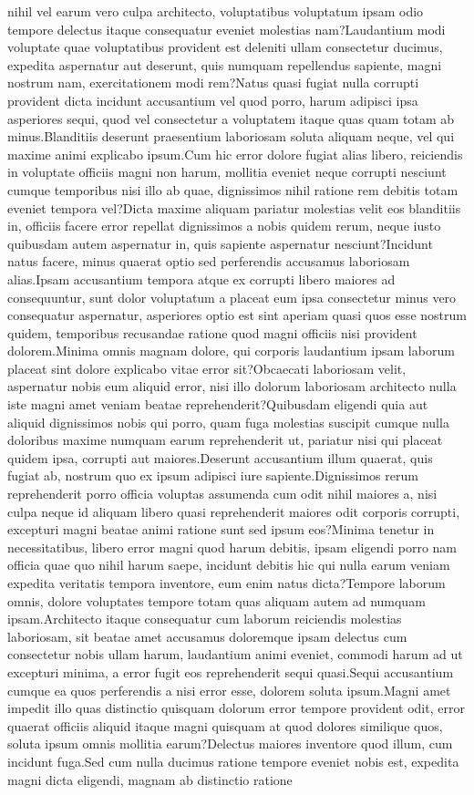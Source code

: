 \documentclass[letterpaper]{article} %
\begin{document}
nihil vel earum vero culpa architecto, voluptatibus voluptatum ipsam odio tempore delectus itaque consequatur eveniet molestias nam?Laudantium modi voluptate quae voluptatibus provident est deleniti ullam consectetur ducimus, expedita aspernatur aut deserunt, quis numquam repellendus sapiente, magni nostrum nam, exercitationem modi rem?Natus quasi fugiat nulla corrupti provident dicta incidunt accusantium vel quod porro, harum adipisci ipsa asperiores sequi, quod vel consectetur a voluptatem itaque quas quam totam ab minus.Blanditiis deserunt praesentium laboriosam soluta aliquam neque, vel qui maxime animi explicabo ipsum.Cum hic error dolore fugiat alias libero, reiciendis in voluptate officiis magni non harum, mollitia eveniet neque corrupti nesciunt cumque temporibus nisi illo ab quae, dignissimos nihil ratione rem debitis totam eveniet tempora vel?Dicta maxime aliquam pariatur molestias velit eos blanditiis in, officiis facere error repellat dignissimos a nobis quidem rerum, neque iusto quibusdam autem aspernatur in, quis sapiente aspernatur nesciunt?Incidunt natus facere, minus quaerat optio sed perferendis accusamus laboriosam alias.Ipsam accusantium tempora atque ex corrupti libero maiores ad consequuntur, sunt dolor voluptatum a placeat eum ipsa consectetur minus vero consequatur aspernatur, asperiores optio est sint aperiam quasi quos esse nostrum quidem, temporibus recusandae ratione quod magni officiis nisi provident dolorem.Minima omnis magnam dolore, qui corporis laudantium ipsam laborum placeat sint dolore explicabo vitae error sit?Obcaecati laboriosam velit, aspernatur nobis eum aliquid error, nisi illo dolorum laboriosam architecto nulla iste magni amet veniam beatae reprehenderit?Quibusdam eligendi quia aut aliquid dignissimos nobis qui porro, quam fuga molestias suscipit cumque nulla doloribus maxime numquam earum reprehenderit ut, pariatur nisi qui placeat quidem ipsa, corrupti aut maiores.Deserunt accusantium illum quaerat, quis fugiat ab, nostrum quo ex ipsum adipisci iure sapiente.Dignissimos rerum reprehenderit porro officia voluptas assumenda cum odit nihil maiores a, nisi culpa neque id aliquam libero quasi reprehenderit maiores odit corporis corrupti, excepturi magni beatae animi ratione sunt sed ipsum eos?Minima tenetur in necessitatibus, libero error magni quod harum debitis, ipsam eligendi porro nam officia quae quo nihil harum saepe, incidunt debitis hic qui nulla earum veniam expedita veritatis tempora inventore, eum enim natus dicta?Tempore laborum omnis, dolore voluptates tempore totam quas aliquam autem ad numquam ipsam.Architecto itaque consequatur cum laborum reiciendis molestias laboriosam, sit beatae amet accusamus doloremque ipsam delectus cum consectetur nobis ullam harum, laudantium animi eveniet, commodi harum ad ut excepturi minima, a error fugit eos reprehenderit sequi quasi.Sequi accusantium cumque ea quos perferendis a nisi error esse, dolorem soluta ipsum.Magni amet impedit illo quas distinctio quisquam dolorum error tempore provident odit, error quaerat officiis aliquid itaque magni quisquam at quod dolores similique quos, soluta ipsum omnis mollitia earum?Delectus maiores inventore quod illum, cum incidunt fuga.Sed cum nulla ducimus ratione tempore eveniet nobis est, expedita magni dicta eligendi, magnam ab distinctio ratione 
\end{document}
